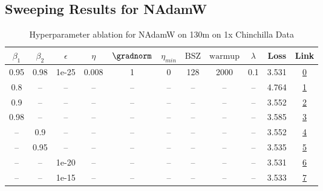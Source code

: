 \subsection{Sweeping Results for NAdamW}%
\begin{table}[H]
\centering
\caption{Hyperparameter ablation for NAdamW on 130m on 1x Chinchilla Data}
\label{tab:ablation_nadamw_130m_on_1x_chinchilla_data}
\begin{tabular}{ccccccccccc}
\toprule
$\beta_1$ & $\beta_2$ & $\epsilon$ & $\eta$ & $\gradnorm$ & $\eta_{min}$ & $\mathrm{BSZ}$ & $\mathrm{warmup}$ & $\lambda$ & Loss & Link \\
\midrule
0.95 & 0.98 & 1e-25 & 0.008 & 1 & 0 & 128 & 2000 & 0.1 & 3.531 & \href{https://wandb.ai/stanford-mercury/optimizer-scaling/runs/sweep-130m-2B-nadamw2de195lr0.008-wd0.1-minlr0-warmup2000-b10.95-437e7c}{0} \\
\midrule
0.8 & -- & -- & -- & -- & -- & -- & -- & -- & 4.764 & \href{https://wandb.ai/stanford-mercury/optimizer-scaling/runs/sweep-130m-2B-nadamw434949lr0.008-wd0.1-minlr0-warmup2000-b10.8--08f271}{1} \\
0.9 & -- & -- & -- & -- & -- & -- & -- & -- & 3.552 & \href{https://wandb.ai/stanford-mercury/optimizer-scaling/runs/sweep-130m-2B-nadamwd53b3flr0.008-wd0.1-minlr0-warmup2000-b10.9--c3b202}{2} \\
0.98 & -- & -- & -- & -- & -- & -- & -- & -- & 3.585 & \href{https://wandb.ai/stanford-mercury/optimizer-scaling/runs/sweep-130m-2B-nadamw2aa7d8lr0.008-wd0.1-minlr0-warmup2000-b10.98-d13a84}{3} \\
-- & 0.9 & -- & -- & -- & -- & -- & -- & -- & 3.552 & \href{https://wandb.ai/stanford-mercury/optimizer-scaling/runs/sweep-130m-2B-nadamw8079eflr0.008-wd0.1-minlr0-warmup2000-b10.95-da3b17}{4} \\
-- & 0.95 & -- & -- & -- & -- & -- & -- & -- & 3.535 & \href{https://wandb.ai/stanford-mercury/optimizer-scaling/runs/sweep-130m-2B-nadamwf5b595lr0.008-wd0.1-minlr0-warmup2000-b10.95-538632}{5} \\
-- & -- & 1e-20 & -- & -- & -- & -- & -- & -- & 3.531 & \href{https://wandb.ai/stanford-mercury/optimizer-scaling/runs/sweep-130m-2B-nadamwf2ca74lr0.008-wd0.1-minlr0-warmup2000-b10.95-d57343}{6} \\
-- & -- & 1e-15 & -- & -- & -- & -- & -- & -- & 3.533 & \href{https://wandb.ai/stanford-mercury/optimizer-scaling/runs/sweep-130m-2B-nadamwd2c0fblr0.008-wd0.1-minlr0-warmup2000-b10.95-142d0c}{7} \\

\end{tabular}
\end{table}
